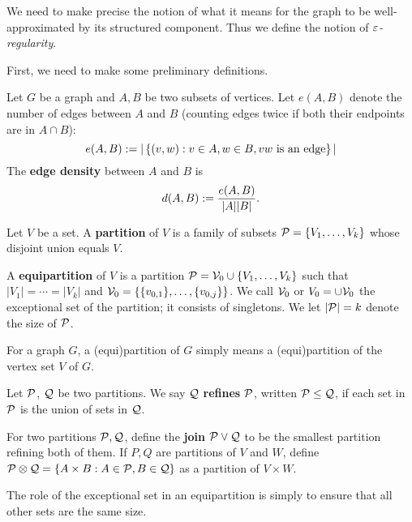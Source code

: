 We need to make precise the notion of what it means for the graph to be well-approximated by its structured component. Thus we define the notion of {\it $\ep$-regularity}.

First, we need to make some preliminary definitions.

\begin{df}
Let $G$ be a graph and $A,B$ be two subsets of vertices. Let $e(A,B)$ denote the number of edges between $A$ and $B$ (counting edges twice if both their endpoints are in $A\cap B$):
\[
e(A,B):=|\set{(v,w)}{v\in A,w\in B,vw\text{ is an edge}}|%
\]
The \textbf{edge density} between $A$ and $B$ is
\[
d(A,B):=\fc{e(A,B)}{|A||B|}.
\]
\end{df}

\begin{df}
Let $V$ be a set. A \textbf{partition} of $V$ is a family of subsets $\cal P=\{V_1,\ldots, V_k\}$ whose disjoint union equals $V$.

A \textbf{equipartition} of $V$ is a partition $\cal P=\cal V_0\cup \{V_1,\ldots,V_k\}$ such that $|V_1|=\cdots =|V_k|$ and $\cal V_0=\{\{v_{0,1}\},\ldots, \{v_{0,j}\}\}$. We call $\cal V_0$ or $V_0=\cup \cal V_0$ the exceptional set of the partition; it consists of singletons. We let $|\cal P|=k$ denote the size of $\cal P$.

For a graph $G$, a (equi)partition of $G$ simply means a (equi)partition of the vertex set $V$ of $G$.

Let $\cal P$, $\cal Q$ be two partitions. We say $\cal Q$ \textbf{refines} $\cal P$, written $\cal P\le \cal Q$, if each set in $\cal P$ is the union of sets in $\cal Q$.

For two partitions $\cal P,\cal Q$, define the \textbf{join} $\cal P\vee \cal Q$ to be the smallest partition refining both of them. If $P,Q$ are partitions of $V$ and $W$, define $\cal P\ot \cal Q=\set{A\times B}{A\in \cal P,B\in \cal Q}$ as a partition of $V\times W$.
\end{df}
The role of the exceptional set in an equipartition is simply to ensure that all other sets are the same size. 

